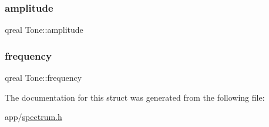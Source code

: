 \subsubsection{\texorpdfstring{amplitude}{amplitude}}
{\footnotesize\ttfamily qreal Tone\+::amplitude}

\hypertarget{struct_tone_af9f6f7f70cd653e3a4033d1d9bb51657}{}\label{struct_tone_af9f6f7f70cd653e3a4033d1d9bb51657} 
\subsubsection{\texorpdfstring{frequency}{frequency}}
{\footnotesize\ttfamily qreal Tone\+::frequency}



The documentation for this struct was generated from the following file\+:\begin{DoxyCompactItemize}
\item 
app/\hyperlink{spectrum_8h}{spectrum.\+h}\end{DoxyCompactItemize}
